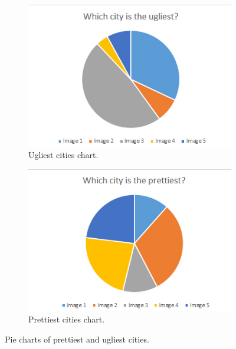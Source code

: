 	\begin{figure}[h]
	\begin{subfigure}{0.5\textwidth}
		\centering
		\includegraphics[width=0.9\linewidth]{"Images/Ugliest"}
		\caption{Ugliest cities chart.}
		\label{fig:pie-chart-ugly}
	\end{subfigure}
	\begin{subfigure}{0.5\textwidth}
		\centering
		\includegraphics[width=0.9\linewidth]{"Images/Prettiest"}
		\caption{Prettiest cities chart.}
		\label{fig:pie-chart-pretty}
	\end{subfigure}
	\caption{Pie charts of prettiest and ugliest cities.}
	\label{fig:pie-chart-ugly-pretty}
\end{figure}

